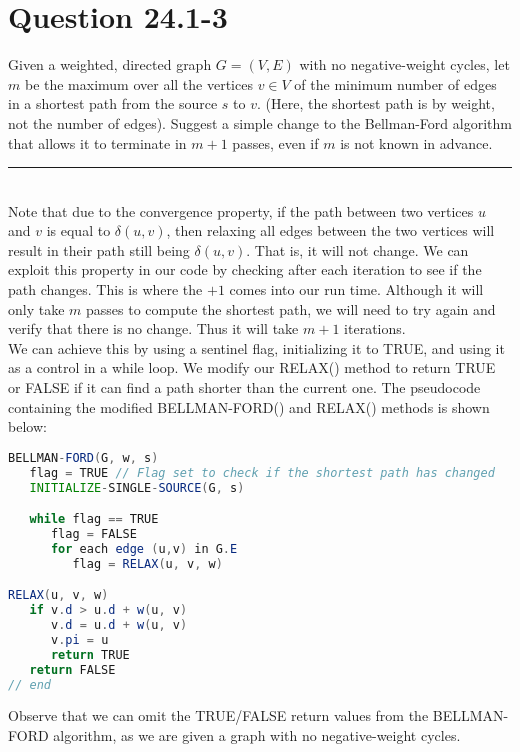 \documentclass[20pt]{article} %
\begin{document}
\newpage
\section{Question 24.1-3} 
Given a weighted, directed graph $G = (V, E)$ with no negative-weight cycles, let $m$ be the maximum over all the vertices $v \in V$ of the minimum  number of edges in a shortest path from the source $s$ to $v$.  (Here, the shortest path is by weight, not the number of edges). Suggest a simple change to the Bellman-Ford algorithm that allows it to terminate in $m + 1$ passes, even if $m$ is not known in advance. \\
\noindent\rule{2cm}{0.4pt} \\

Note that due to the convergence property, if the path between two vertices $u$ and $v$ is equal to $\delta(u,v)$, then relaxing all edges between the two vertices will result in their path still being $\delta(u,v)$. That is, it will not change.  We can exploit this property in our code by checking after each iteration to see if the path changes.  This is where the $+ 1$ comes into our run time.  Although it will only take $m$ passes to compute the shortest path, we will need to try again and verify that there is no change.  Thus it will take $m+1$ iterations. \\

We can achieve this by using a sentinel flag, initializing it to TRUE, and using it as a control in a while loop.  We modify our RELAX() method to return TRUE or FALSE if it can find a path shorter than the current one.  The pseudocode containing the modified BELLMAN-FORD() and RELAX() methods is shown below:

\begin{lstlisting}[language=java]
BELLMAN-FORD(G, w, s)
   flag = TRUE // Flag set to check if the shortest path has changed
   INITIALIZE-SINGLE-SOURCE(G, s)

   while flag == TRUE
      flag = FALSE
      for each edge (u,v) in G.E
         flag = RELAX(u, v, w)

RELAX(u, v, w)
   if v.d > u.d + w(u, v)
      v.d = u.d + w(u, v)
      v.pi = u
      return TRUE
   return FALSE
// end
\end{lstlisting}

Observe that we can omit the TRUE/FALSE return values from the BELLMAN-FORD algorithm, as we are given a graph with no negative-weight cycles.
\end{document}
